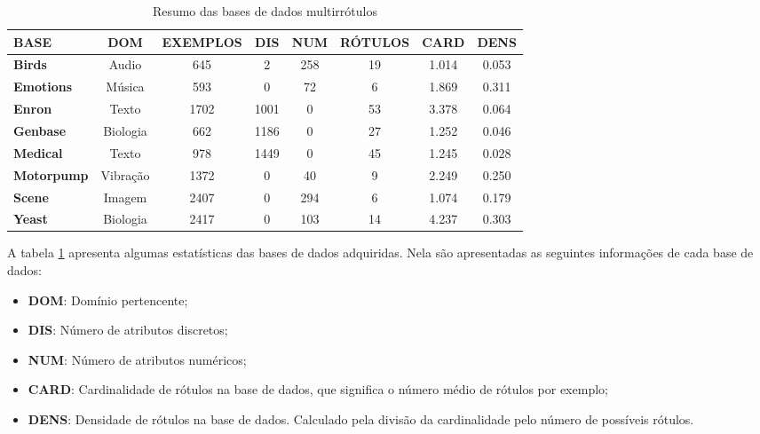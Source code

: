 \begin{table}[h]
\begin{tabular}{|l|ccccccc|}
\hline
\textbf{BASE}      & \textbf{DOM} & \textbf{EXEMPLOS} & \textbf{DIS} & \textbf{NUM} & \textbf{RÓTULOS} & \textbf{CARD} & \textbf{DENS} \\ \hline
\textbf{Birds}     & Audio            & 645               & 2                 & 258                & 19               & 1.014                  & 0.053              \\
\textbf{Emotions}  & Música           & 593               & 0                 & 72                 & 6                & 1.869                  & 0.311              \\
\textbf{Enron}     & Texto            & 1702              & 1001              & 0                  & 53               & 3.378                  & 0.064              \\
\textbf{Genbase}   & Biologia         & 662               & 1186              & 0                  & 27               & 1.252                  & 0.046              \\
\textbf{Medical}   & Texto            & 978               & 1449              & 0                  & 45               & 1.245                  & 0.028              \\
\textbf{Motorpump} & Vibração         & 1372              & 0                 & 40                 & 9                & 2.249                  & 0.250              \\
\textbf{Scene}     & Imagem           & 2407              & 0                 & 294                & 6                & 1.074                  & 0.179              \\
\textbf{Yeast}     & Biologia         & 2417              & 0                 & 103                & 14               & 4.237                  & 0.303              \\  \hline

\end{tabular}
\caption{Resumo das bases de dados multirrótulos}
\label{tab:datas}
\end{table}

A tabela \ref{tab:datas} apresenta algumas estatísticas das bases de dados adquiridas.
Nela são apresentadas as seguintes informações de cada base de dados:
\begin{itemize}
  \item \textbf{DOM}: Domínio pertencente;
  \item \textbf{DIS}: Número de atributos discretos;
  \item \textbf{NUM}: Número de atributos numéricos;
  \item \textbf{CARD}: Cardinalidade de rótulos na base de dados, que significa o número médio de rótulos por exemplo;
  \item \textbf{DENS}: Densidade de rótulos na base de dados. Calculado pela divisão da cardinalidade pelo número de possíveis rótulos.
\end{itemize}


